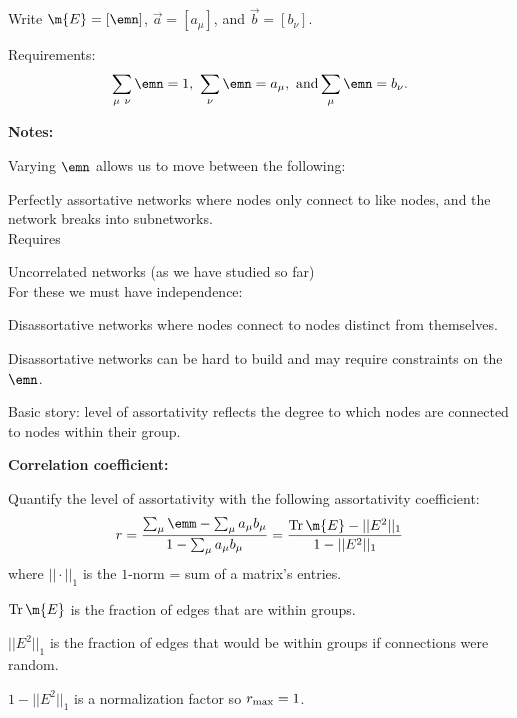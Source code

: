     Write $\m{E} = [\emn]$, $\vec{a} = [a_\mu]$, and $\vec{b} = [b_\nu]$.
  
    Requirements:
    $$
    \sum_{\mu\ \nu} \emn = 1,
    \
    \sum_{\nu} \emn = a_{\mu},
    \
    \mbox{and}
    \sum_{\mu} \emn = b_{\nu}.
    $$
  


  \textbf{Notes:}

  
   Varying $\emn$ allows us to move
    between the following:
    
     
      \alert{Perfectly assortative networks} where
      nodes only connect to like nodes, and the
      network breaks into subnetworks.\\
      {
        Requires 
      }
    
      \alert{Uncorrelated networks} (as we have studied so far)\\
      {
        For these we must have independence:
      }
    
      \alert{Disassortative networks} where nodes connect
      to nodes distinct from themselves.
    
  
    Disassortative networks can be hard to build
    and may require constraints on the $\emn$.
  
    Basic story: level of assortativity reflects
    the degree to which nodes are connected to
    nodes within their group.
  


  \textbf{Correlation coefficient:}

  
   Quantify the level of assortativity
    with the following \alert{assortativity coefficient}\cite{newman2003e}:
    $$
    r = 
    \frac{
      \sum_{\mu} \emm - \sum_{\mu} a_{\mu} b_{\mu}
      }
    {
      1 - \sum_{\mu} a_{\mu} b_{\mu}
    }
    =
    \frac{
      {\rm Tr} \, \m{E} - || E^2 ||_1
    }
    {
      1 - || E^2 ||_1
    }
    $$
    where $|| \cdot ||_1$ is the $1$-norm = sum of a matrix's entries.
  
    ${\rm Tr} \, \m{E}$ is the fraction of edges that are within groups.
  
    $|| E^2 ||_1$ is the fraction of edges that would be within
    groups if connections were random.
  
    $1 - || E^2 ||_1$ is a normalization factor so $r_{\rm max} = 1$.
  
